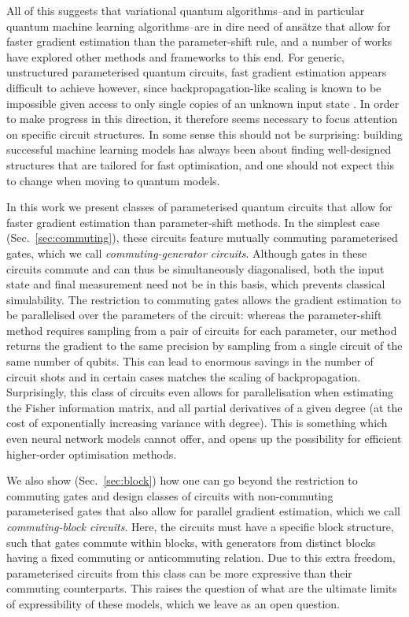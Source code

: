 \documentclass[twocolumn]{revtex4-2}
\begin{document}
All of this suggests that variational quantum algorithms--and in particular quantum machine learning algorithms--are in dire need of ans\"atze that allow for faster gradient estimation than the parameter-shift rule, and a number of works have explored other methods \cite{anastasiou2023really,basheer2022alternating,kasture2022protocols,frugal1,frugal2,frugal3,frugal4} and frameworks \cite{verdon2018universal} to this end. For generic, unstructured parameterised quantum circuits, fast gradient estimation appears difficult to achieve however, since backpropagation-like scaling is known to be impossible given access to only single copies of an unknown input state \cite{abbas2023quantum}. In order to make progress in this direction, it therefore seems necessary to focus attention on specific circuit structures. In some sense this should not be surprising: building successful machine learning models has always been about finding well-designed structures that are tailored for fast optimisation, and one should not expect this to change when moving to quantum models.   

In this work we present classes of parameterised quantum circuits that allow for faster gradient estimation than parameter-shift methods. In the simplest case (Sec.\ \ref{sec:commuting}), these circuits feature mutually commuting parameterised gates, which we call \emph{commuting-generator circuits}. Although gates in these circuits commute and can thus be simultaneously diagonalised, both the input state and final measurement need not be in this basis, which prevents classical simulability. The restriction to commuting gates allows the gradient estimation to be parallelised over the parameters of the circuit: whereas the parameter-shift method requires sampling from a pair of circuits for each parameter, our method returns the gradient to the same precision by sampling from a single circuit of the same number of qubits. This can lead to enormous savings in the number of circuit shots and in certain cases matches the scaling of backpropagation. Surprisingly, this class of circuits even allows for parallelisation when estimating the Fisher information matrix, and all partial derivatives of a given degree (at the cost of exponentially increasing variance with degree). This is something which even neural network models cannot offer, and opens up the possibility for efficient higher-order optimisation methods. 

We also show (Sec.\ \ref{sec:block}) how one can go beyond the restriction to commuting gates and design classes of circuits with non-commuting parameterised gates that also allow for parallel gradient estimation, which we call \emph{commuting-block circuits}. Here, the circuits must have a specific block structure, such that gates commute within blocks, with generators from distinct blocks having a fixed commuting or anticommuting relation. Due to this extra freedom, parameterised circuits from this class can be more expressive than their commuting counterparts. This raises the question of what are the ultimate limits of expressibility of these models, which we leave as an open question.  
\end{document}
